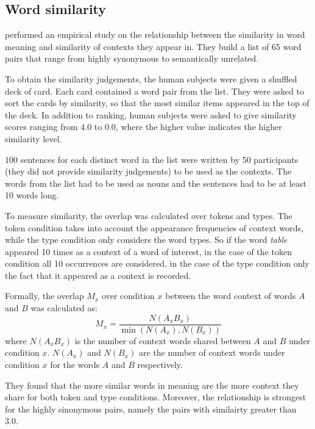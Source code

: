 \subsection{Word similarity}
\label{sec:lexical-similarity}

 performed an empirical study on the relationship between the similarity in word meaning and similarity of contexts they appear in. They build a list of 65 word pairs that range from highly synonymous to semantically unrelated.

To obtain the similarity judgements, the human subjects were given a shuffled deck of card. Each card contained a word pair from the list. They were asked to sort the cards by similarity, so that the most similar items appeared in the top of the deck. In addition to ranking, human subjects were asked to give similarity scores ranging from 4.0 to 0.0, where the higher value indicates the higher similarity level.

100 sentences for each distinct word in the list were written by 50 participants (they did not provide similarity judgements) to be used as the contexts. The words from the list had to be used as nouns and the sentences had to be at least 10 words long.

To measure similarity, the overlap was calculated over tokens and types. The token condition takes into account the appearance frequencies of context words, while the type condition only considers the word types. So if the word \textit{table} appeared 10 times as a context of a word of interest, in the case of the token condition all 10 occurrences are considered, in the case of the type condition only the fact that it appeared as a context is recorded.

Formally, the overlap $M_x$ over condition $x$ between the word context of words $A$ and $B$ was calculated as:
%
\begin{equation*}
  M_x = \frac{N(A_xB_x)}{\min(N(A_x), N(B_x))}
\end{equation*}
%
where $N(A_xB_x)$ is the number of context words shared between $A$ and $B$ under condition $x$. $N(A_x)$ and $N(B_x)$ are the number of context words under condition $x$ for the words $A$ and $B$ respectively.

They found that the more similar words in meaning are the more context they share for both token and type conditions. Moreover, the relationship is strongest for the highly sinonymous pairs, namely the pairs with similairty greater than 3.0.

